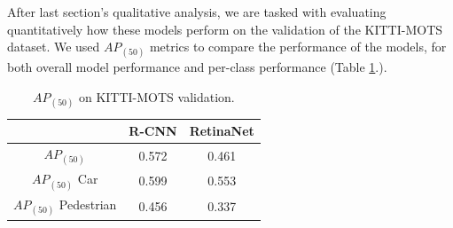 \documentclass[12pt,a4paper,twocolumn,twoside]{article}
\begin{document}
After last section's qualitative analysis, we are tasked with evaluating
quantitatively how these models perform on the validation of the KITTI-MOTS dataset. We used 
$AP_{(50)}$ metrics to compare the performance of the models, for both 
overall model performance and per-class performance (Table \ref{table:KITTI_Table1}.). 

\begin{table}[ht]
    \centering
    \begin{tabular}{|c || c | c|} 
        \hline
          & R-CNN & RetinaNet \\ [0.8ex] 
          \hline
         $AP_{(50)}$ & 0.572 & 0.461  \\ 
         \hline
         $AP_{(50)}$ Car & 0.599 & 0.553 \\
         \hline
         $AP_{(50)}$ Pedestrian & 0.456 & 0.337 \\
         \hline
    \end{tabular}
    \caption{\label{table:KITTI_Table1}$AP_{(50)}$ on KITTI-MOTS validation.}
\end{table}

\printbibliography
\end{document}
